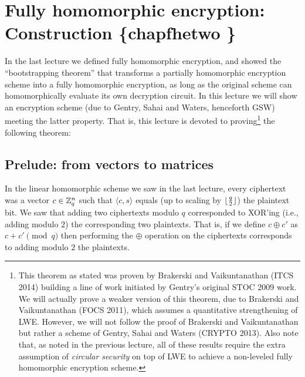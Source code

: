 \chapter{Fully homomorphic encryption: Construction \{chapfhetwo
\}}\label{Fully-homomorphic-encrypt}

In the last lecture we defined fully homomorphic encryption, and showed
the ``bootstrapping theorem'' that transforms a partially homomorphic
encryption scheme into a fully homomorphic encryption, as long as the
original scheme can homomorphically evaluate its own decryption circuit.
In this lecture we will show an encryption scheme (due to Gentry, Sahai
and Waters, henceforth GSW) meeting the latter property. That is, this
lecture is devoted to proving\footnote{This theorem as stated was proven
  by Brakerski and Vaikuntanathan (ITCS 2014) building a line of work
  initiated by Gentry's original STOC 2009 work. We will actually prove
  a weaker version of this theorem, due to Brakerski and Vaikuntanathan
  (FOCS 2011), which assumes a quantitative strengthening of LWE.
  However, we will not follow the proof of Brakerski and Vaikuntanathan
  but rather a scheme of Gentry, Sahai and Waters (CRYPTO 2013). Also
  note that, as noted in the previous lecture, all of these results
  require the extra assumption of \emph{circular security} on top of LWE
  to achieve a non-leveled fully homomorphic encryption scheme.} the
following theorem:

\hypertarget{LWEFHEthm}{}

\section{Prelude: from vectors to
matrices}\label{Prelude-from-vectors-to-m}

In the linear homomorphic scheme we saw in the last lecture, every
ciphertext was a vector \(c\in{\mathbb{Z}}_q^n\) such that \(\langle c,s \rangle\)
equals (up to scaling by \(\lfloor \tfrac{q}{2} \rfloor\)) the plaintext bit. We
saw that adding two ciphertexts modulo \(q\) corresponded to XOR'ing
(i.e., adding modulo \(2\)) the corresponding two plaintexts. That is,
if we define \(c \oplus c'\) as \(c+c' \pmod{q}\) then performing the
\(\oplus\) operation on the ciphertexts corresponds to adding modulo
\(2\) the plaintexts.

